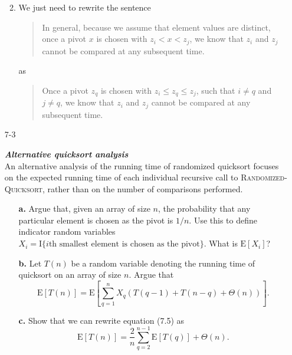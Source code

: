 \documentclass{report}
\makeatletter
\renewenvironment{framed}{%
 \def\FrameCommand##1{\hskip\@totalleftmargin
 \fboxsep=\FrameSep\fbox{##1}}%
 \MakeFramed {\advance\hsize-\width
   \@totalleftmargin\z@ \linewidth\hsize
   \@setminipage}}%
 {\par\unskip\endMakeFramed}
\let\oldnl\nl%
\newcommand{\nonl}{\renewcommand{\nl}{\let\nl\oldnl}}%
\makeatother
\begin{document}
\begin{enumerate}
\begin{framed}
\begin{enumerate}
{\begin{algorithm}[H]
\SetAlgoNoEnd\DontPrintSemicolon
\BlankLine
{}
\nonl{}
\end{algorithm}
}
\item{We just need to rewrite the sentence
\begin{quote}
  In general, because we assume that element values are distinct, once a pivot
  $x$ is chosen with $z_i < x < z_j$, we know that $z_i$ and $z_j$ cannot be
  compared at any subsequent time.
\end{quote}
as
\begin{quote}
  Once a pivot $z_q$ is chosen with $z_i \le z_q \le z_j$, such that
  $i \neq q$ and $j \neq q$, we know that $z_i$ and $z_j$ cannot be compared at
  any subsequent time.
\end{quote}
}
\end{enumerate}
\end{framed}

\newpage

\item[7{-}3]{\textbf{\emph{Alternative quicksort analysis}}\\
An alternative analysis of the running time of randomized quicksort focuses on
the expected running time of each individual recursive call to
\textsc{Randomized-Quicksort}, rather than on the number of comparisons
performed.

\begin{enumerate}
\item[\textbf{a.}]{Argue that, given an array of size $n$, the probability that
any particular element is chosen as the pivot is $1/n$. Use this to define
indicator random variables
$X_i = \text{I}\{i\text{th smallest element is chosen as the pivot}\}$. What is
$\text{E}[X_i]$?}

\item[\textbf{b.}]{Let $T(n)$ be a random variable denoting the running time of
quicksort on an array of size $n$. Argue that
\[
  \text{E}[T(n)] = \text{E}\left[ \sum_{q = 1}^{n}{X_q (T(q - 1) + T(n - q) + \Theta(n))} \right].
\]}

\item[\textbf{c.}]{Show that we can rewrite equation (7.5) as
\[
  \text{E}[T(n)] = \frac{2}{n} \sum_{q = 2}^{n - 1} \text{E}[T(q)] + \Theta(n).
\]}


\end{enumerate}}
\end{enumerate}
\end{document}
